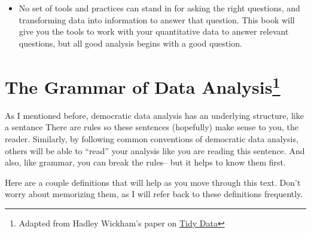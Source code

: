 \documentclass[]{book}
\providecommand{\tightlist}{%
  \setlength{\itemsep}{0pt}\setlength{\parskip}{0pt}}
\begin{document}
\begin{itemize}
\tightlist
\item
  No set of tools and practices can stand in for asking the right questions, and transforming data into information to answer that question. This book will give you the tools to work with your quantitative data to answer relevant questions, but all good analysis begins with a good question.
\end{itemize}

\hypertarget{the-grammar-of-data-analysis}{%
\section[The Grammar of Data Analysis]{\texorpdfstring{The Grammar of Data Analysis\footnote{Adapted from Hadley Wickham's paper on \href{https://vita.had.co.nz/papers/tidy-data.pdf}{Tidy Data}}}{The Grammar of Data Analysis}}\label{the-grammar-of-data-analysis}}

As I mentioned before, democratic data analysis has an underlying structure, like a sentance There are rules so these sentences (hopefully) make sense to you, the reader. Similarly, by following common conventions of democratic data analysis, others will be able to ``read'' your analysis like you are reading this sentence. And also, like grammar, you can break the rules-- but it helps to know them first.

Here are a couple definitions that will help as you move through this text. Don't worry about memorizing them, as I will refer back to these definitions frequently.
\end{document}
